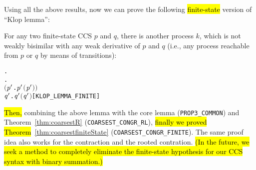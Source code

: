 Using all the above results, now we can prove the following \hl{finite-state}
version of ``Klop lemma'':
\begin{lemma}
\label{lem:klop-lemma-finite}
For any two finite-state CCS $p$ and $q$, there is another process
$k$, which is not weakly bisimilar 
with any weak derivative  of $p$
and $q$ (i.e., any process reachable from $p$ or $q$ by means of transitions):
\begin{alltt}
\HOLTokenTurnstile{} \HOLSymConst{\HOLTokenForall{}} .
         \HOLSymConst{\HOLTokenConj{}}   \HOLSymConst{\HOLTokenImp{}}
       \HOLSymConst{\HOLTokenExists{}}.
             \HOLSymConst{\HOLTokenConj{}} \ensuremath{(}\HOLSymConst{\HOLTokenForall{}}\ensuremath{\HOLBoundVar{p}\sp{\prime}} .  \HOLTokenWeakTransBegin{}\HOLTokenWeakTransEnd \ensuremath{\HOLBoundVar{p}\sp{\prime}} \HOLSymConst{\HOLTokenImp{}} \HOLSymConst{\HOLTokenNeg{}}\ensuremath{(}\ensuremath{\HOLBoundVar{p}\sp{\prime}} \HOLSymConst{\HOLTokenWeakEQ} \ensuremath{)}\ensuremath{)} \HOLSymConst{\HOLTokenConj{}}
           \HOLSymConst{\HOLTokenForall{}}\ensuremath{\HOLBoundVar{q}\sp{\prime}} .  \HOLTokenWeakTransBegin{}\HOLTokenWeakTransEnd \ensuremath{\HOLBoundVar{q}\sp{\prime}} \HOLSymConst{\HOLTokenImp{}} \HOLSymConst{\HOLTokenNeg{}}\ensuremath{(}\ensuremath{\HOLBoundVar{q}\sp{\prime}} \HOLSymConst{\HOLTokenWeakEQ} \ensuremath{)}\hfill{[KLOP_LEMMA_FINITE]}
\end{alltt}
\end{lemma}
\hl{Then,} combining the above lemma with the core lemma
(\texttt{PROP3_COMMON}) and Theorem~\ref{thm:coarsestR} (\texttt{COARSEST_CONGR_RL}),
\hl{finally we proved Theorem}~\ref{thm:coarsestfiniteState}
(\texttt{COARSEST_CONGR_FINITE}). The same proof idea also works for
the contraction and the rooted contration. \hl{(In the future, we seek a method to
completely eliminate the finite-state hypothesis for our CCS syntax
with binary summation.)}

